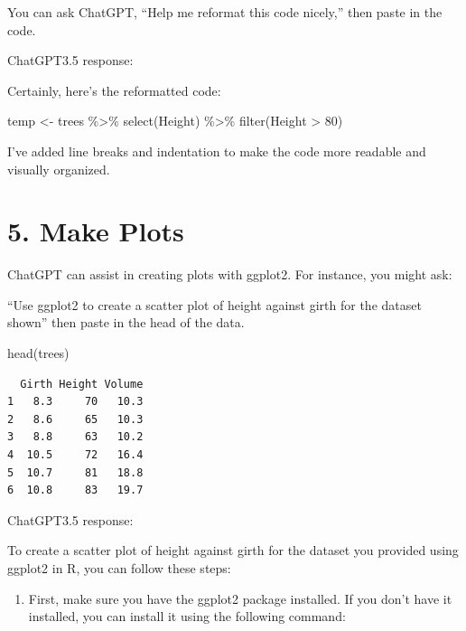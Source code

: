 \documentclass[
  letterpaper,
  DIV=11,
  numbers=noendperiod]{scrreprt}
\newenvironment{Shaded}{\begin{snugshade}}{\end{snugshade}}
\newcommand{\DecValTok}[1]{\textcolor[rgb]{0.68,0.00,0.00}{#1}}
\newcommand{\FunctionTok}[1]{\textcolor[rgb]{0.28,0.35,0.67}{#1}}
\newcommand{\NormalTok}[1]{\textcolor[rgb]{0.00,0.23,0.31}{#1}}
\newcommand{\OtherTok}[1]{\textcolor[rgb]{0.00,0.23,0.31}{#1}}
\newcommand{\SpecialCharTok}[1]{\textcolor[rgb]{0.37,0.37,0.37}{#1}}
\providecommand{\tightlist}{%
  \setlength{\itemsep}{0pt}\setlength{\parskip}{0pt}}\usepackage{longtable,booktabs,array}
\begin{document}
You can ask ChatGPT, ``Help me reformat this code nicely,'' then paste
in the code.

ChatGPT3.5 response:

\label{chatgpt}
Certainly, here's the reformatted code:

\begin{Shaded}
\begin{Highlighting}[]
\NormalTok{temp }\OtherTok{\textless{}{-}}\NormalTok{ trees }\SpecialCharTok{\%\textgreater{}\%}
  \FunctionTok{select}\NormalTok{(Height) }\SpecialCharTok{\%\textgreater{}\%}
  \FunctionTok{filter}\NormalTok{(Height }\SpecialCharTok{\textgreater{}} \DecValTok{80}\NormalTok{)}
\end{Highlighting}
\end{Shaded}

I've added line breaks and indentation to make the code more readable
and visually organized.

\section{5. Make Plots}\label{make-plots}

ChatGPT can assist in creating plots with ggplot2. For instance, you
might ask:

``Use ggplot2 to create a scatter plot of height against girth for the
dataset shown'' then paste in the head of the data.

\begin{Shaded}
\begin{Highlighting}[]
\FunctionTok{head}\NormalTok{(trees)}
\end{Highlighting}
\end{Shaded}

\begin{verbatim}
  Girth Height Volume
1   8.3     70   10.3
2   8.6     65   10.3
3   8.8     63   10.2
4  10.5     72   16.4
5  10.7     81   18.8
6  10.8     83   19.7
\end{verbatim}

ChatGPT3.5 response:

\label{chatgpt}
To create a scatter plot of height against girth for the dataset you
provided using ggplot2 in R, you can follow these steps:

\begin{enumerate}
\def\labelenumi{\arabic{enumi}.}
\tightlist
\item
  First, make sure you have the ggplot2 package installed. If you don't
  have it installed, you can install it using the following command:
\end{enumerate}
\end{document}
